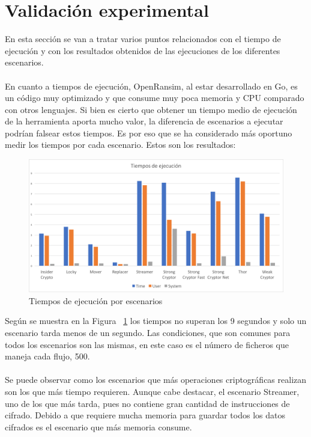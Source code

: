 \documentclass[a4paper,12pt]{article}
\begin{document}
\section{Validación experimental}
En esta sección se van a tratar varios puntos relacionados con el tiempo de ejecución y con los resultados obtenidos de las ejecuciones de los diferentes escenarios.\\\\
En cuanto a tiempos de ejecución, OpenRansim, al estar desarrollado en Go, es un código muy optimizado y que consume muy poca memoria y CPU comparado con otros lenguajes. Si bien es cierto que obtener un tiempo medio de ejecución de la herramienta aporta mucho valor, la diferencia de escenarios a ejecutar podrían falsear estos tiempos. Es por eso que se ha considerado más oportuno medir los tiempos por cada escenario. Estos son los resultados:
\begin{figure}[H]
	\centering
	\includegraphics[scale=0.45]{imagenes/tiempos.png}
	\caption[Tiempos de ejecución por escenarios]{Tiempos de ejecución por escenarios}
	\label{fig:figure3}
\end{figure}
Según se muestra en la Figura ~\ref{fig:figure3} los tiempos no superan los 9 segundos y solo un escenario tarda menos de un segundo. Las condiciones, que son comunes para todos los escenarios son las mismas, en este caso es el número de ficheros que maneja cada flujo, 500.\\\\
Se puede observar como los escenarios que más operaciones criptográficas realizan son los que más tiempo requieren. Aunque cabe destacar, el escenario Streamer, uno de los que más tarda, pues no contiene gran cantidad de instrucciones de cifrado. Debido a que requiere mucha memoria para guardar todos los datos cifrados es el escenario que más memoria consume.\\\\
\end{document}
